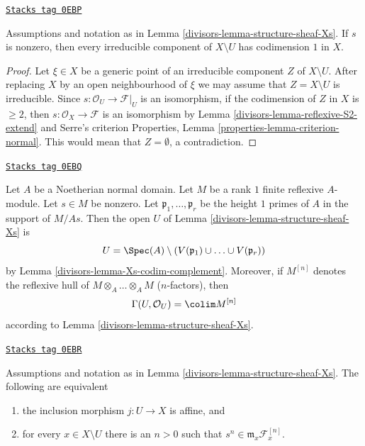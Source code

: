 \begin{lemma}
\label{divisors-lemma-Xs-codim-complement}
\href{https://stacks.math.columbia.edu/tag/0EBP}{\texttt{Stacks tag 0EBP}}

Assumptions and notation as in Lemma \ref{divisors-lemma-structure-sheaf-Xs}.
If $s$ is nonzero, then every irreducible component of $X \setminus U$
has codimension $1$ in $X$.
\end{lemma}

\begin{proof}

Let $\xi \in X$ be a generic point of an irreducible component $Z$ of
$X \setminus U$. After replacing $X$ by an open neighbourhood of
$\xi$ we may assume that $Z = X \setminus U$ is irreducible. Since
$s : \mathcal{O}_U \to \mathcal{F}|_U$ is an isomorphism, if
the codimension of $Z$ in $X$ is $\geq 2$, then
$s : \mathcal{O}_X \to \mathcal{F}$ is an isomorphism by
Lemma \ref{divisors-lemma-reflexive-S2-extend} and Serre's criterion
Properties, Lemma \ref{properties-lemma-criterion-normal}.
This would mean that $Z = \emptyset$, a contradiction.
\end{proof}

\begin{remark}
\label{divisors-remark-structure-sheaf-Xs}
\href{https://stacks.math.columbia.edu/tag/0EBQ}{\texttt{Stacks tag 0EBQ}}

Let $A$ be a Noetherian normal domain. Let $M$ be a rank $1$ finite reflexive
$A$-module. Let $s \in M$ be nonzero. Let $\mathfrak p_1, \ldots, \mathfrak p_r$
be the height $1$ primes of $A$ in the support of $M/As$.
Then the open $U$ of Lemma \ref{divisors-lemma-structure-sheaf-Xs} is
$$
U = \Spec(A) \setminus
\left(V(\mathfrak p_1) \cup \ldots \cup V(\mathfrak p_r)\right)
$$
by Lemma \ref{divisors-lemma-Xs-codim-complement}. Moreover, if $M^{[n]}$
denotes the reflexive hull of $M \otimes_A \ldots \otimes_A M$
($n$-factors), then
$$
\Gamma(U, \mathcal{O}_U) = \colim M^{[n]}
$$
according to Lemma \ref{divisors-lemma-structure-sheaf-Xs}.
\end{remark}

\begin{lemma}[Affine Xs]
\label{divisors-lemma-affine-Xs}
\href{https://stacks.math.columbia.edu/tag/0EBR}{\texttt{Stacks tag 0EBR}}

Assumptions and notation as in Lemma \ref{divisors-lemma-structure-sheaf-Xs}.
The following are equivalent
\begin{enumerate}
\item the inclusion morphism $j : U \to X$ is affine, and
\item for every $x \in X \setminus U$ there is an $n > 0$
such that $s^n \in \mathfrak m_x \mathcal{F}^{[n]}_x$.
\end{enumerate}
\end{lemma}

